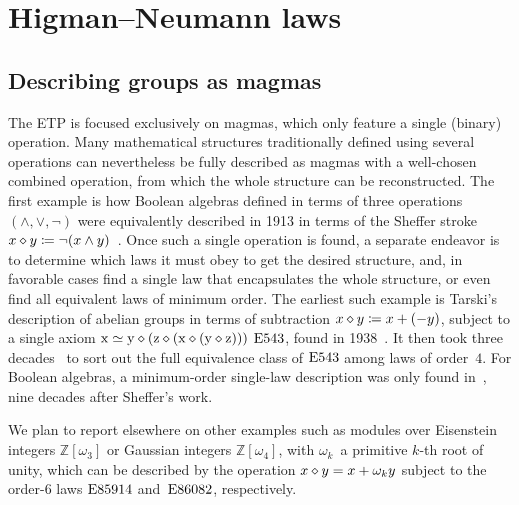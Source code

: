 \section{Higman--Neumann laws}\label{higman-neumann}

\subsection{Describing groups as magmas}

The ETP is focused exclusively on magmas, which only feature a single (binary) operation.  Many mathematical structures traditionally defined using several operations can nevertheless be fully described as magmas with a well-chosen combined operation, from which the whole structure can be reconstructed.  The first example is how Boolean algebras defined in terms of three operations $(\land,\lor,\lnot)$ were equivalently described in 1913 in terms of the Sheffer stroke $x\diamond y\coloneqq \lnot(x\land y)$~\cite{sheffer}.  Once such a single operation is found, a separate endeavor is to determine which laws it must obey to get the desired structure, and, in favorable cases find a single law that encapsulates the whole structure, or even find all equivalent laws of minimum order.  The earliest such example is Tarski's description of abelian groups in terms of subtraction $x\diamond y\coloneqq x+(-y)$, subject to a single axiom $\mathrm{x} \simeq \mathrm{y} \diamond (\mathrm{z} \diamond (\mathrm{x} \diamond (\mathrm{y} \diamond \mathrm{z})))$ $\mathrm{E}543$, found in 1938~\cite{Tarski1938}.  It then took three decades~\cite{higman-neumann,Sholander01021959,Padmanabhan_1969} to sort out the full equivalence class of $\mathrm{E}543$ among laws of order~$4$.  For Boolean algebras, a minimum-order single-law description was only found in~\cite{mccune_et_al}, nine decades after Sheffer's work.

We plan to report elsewhere on other examples such as modules over Eisenstein integers $\mathbb{Z}[\omega_3]$ or Gaussian integers $\mathbb{Z}[\omega_4]$, with $\omega_k$~a primitive $k$-th root of unity, which can be described by the operation $x \diamond y = x + \omega_k y$ subject to the order-$6$ laws $\mathrm{E}85914$ and~$\mathrm{E}86082$, respectively.

